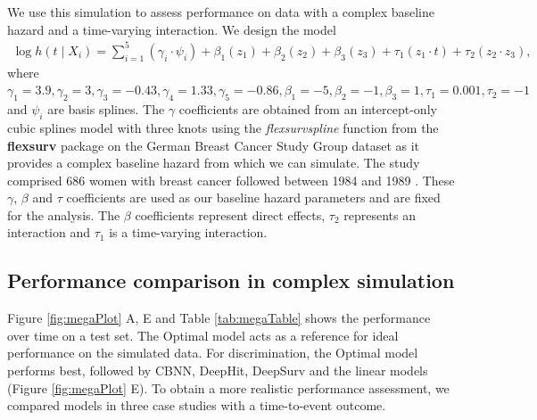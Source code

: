 \documentclass[preprint,12pt]{elsarticle}
\begin{document}
We use this simulation to assess performance on data with a complex baseline hazard and a time-varying interaction. We design the model \begin{align}
\log h(t \mid X_i) =\sum_{i=1}^{5} (\gamma_{i} \cdot \psi_{i}) + \beta_{{1}} (z_{1}) + \beta_{{2}} (z_{2})+ \beta_{{3}} (z_{3})+ \tau_{1} ( z_{1} \cdot t)+ \tau_{2} (z_{2} \cdot z_{3}), \nonumber
\end{align} where
\(\gamma_{1}=3.9, \gamma_{2}=3, \gamma_{3}=-0.43, \gamma_{4}=1.33,\gamma_{5}=-0.86, \beta_{{1}}=-5, \beta_{{2}}=-1, \beta_{{3}}=1, \tau_{1}=0.001, \tau_{2}=-1\)
and \(\psi_{i}\) are basis splines. The \(\gamma\) coefficients are obtained from an intercept-only cubic splines model with three knots using the \emph{flexsurvspline}
function from the \textbf{flexsurv} package \citep{flexsurv} on the German Breast Cancer Study Group dataset as it provides a complex baseline hazard from which
we can simulate. The study comprised 686 women with breast cancer followed between 1984 and 1989 \citep{royston2002flexible}. These $\gamma$, $\beta$ and $\tau$ coefficients are used
as our baseline hazard parameters and are fixed for the analysis. The \(\beta\) coefficients represent direct effects, \(\tau_{2}\) represents an interaction and
\(\tau_{1}\) is a time-varying interaction.

\hypertarget{performance-comparison-in-complex-simulation}{%
\subsection{Performance comparison in complex
simulation}\label{performance-comparison-in-complex-simulation}}


Figure \ref{fig:megaPlot} A, E and Table \ref{tab:megaTable} shows the performance over time on a test set. The Optimal model acts as a reference for ideal performance on the simulated data. For discrimination, the Optimal model performs best,
followed by CBNN, DeepHit, DeepSurv and the linear models (Figure \ref{fig:megaPlot} E). To obtain a more realistic performance assessment, we compared
models in three case studies with a time-to-event outcome.
\end{document}
